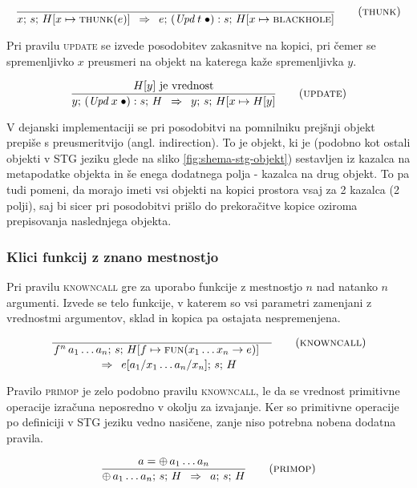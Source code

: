 \begin{equation}	
\infer[thunk]{}{
	x; \, s; \, H[x \mapsto \textsc{thunk}(e)]
}{
	e; \, (\textit{Upd} \; t \; \bullet) : s; \, H[x \mapsto \textsc{blackhole}]
}
\end{equation}

Pri pravilu \textsc{update} se izvede posodobitev zakasnitve na kopici, pri čemer se spremenljivko $x$ preusmeri na objekt na katerega kaže spremenljivka $y$.

\begin{equation}
\infer[update]{
	\text{$H[y]$ je vrednost}
}{
	y; \, (\textit{Upd} \; x \; \bullet) : s; \, H
}{
	y; \, s; \, H[x \mapsto H[y]
}
\end{equation}

V dejanski implementaciji se pri posodobitvi na pomnilniku prejšnji ob\-je\-kt prepiše s preusmeritvijo (angl. indirection). To je objekt, ki je (podobno kot ostali objekti v STG jeziku glede na sliko \ref{fig:shema-stg-objekt}) sestavljen iz kazalca na metapodatke objekta in še enega dodatnega polja - kazalca na drug objekt. To pa tudi pomeni, da morajo imeti vsi objekti na kopici prostora vsaj za 2 kazalca (2 polji), saj bi sicer pri posodobitvi prišlo do prekoračitve kopice oziroma prepisovanja naslednjega objekta.

\subsubsection{Klici funkcij z znano mestnostjo}

Pri pravilu \textsc{knowncall} gre za uporabo funkcije z mestnostjo $n$ nad natanko $n$ argumenti. Izvede se telo funkcije, v katerem so vsi parametri zamenjani z vrednostmi argumentov, sklad in kopica pa ostajata nespremenjena.

\begin{equation}
	\linfer[knowncall]{}{
		f^n \, a_1 \dots a_n; \, s; \, H[f \mapsto \textsc{fun}(x_1 \dots x_n \to e)]
	}{
		e[a_1 / x_1 \dots a_n / x_n]; \, s; \, H
	}
\end{equation}

Pravilo \textsc{primop} je zelo podobno pravilu \textsc{knowncall}, le da se vrednost primitivne operacije izračuna neposredno v okolju za izvajanje. Ker so primitivne operacije po definiciji v STG jeziku vedno nasičene, zanje niso potrebna nobena dodatna pravila.

\begin{equation}
	\infer[primop]{
		a = \oplus \, a_1 \dots a_n
	}{
		\oplus \, a_1 \dots a_n; \, s; \, H
	}{
		a; \, s; \, H
	}
\end{equation}

